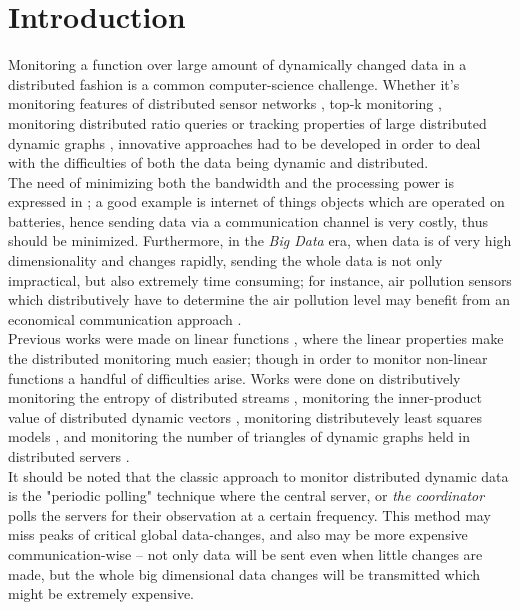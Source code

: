 \documentclass[10pt, conference]{IEEEtran}
\begin{document}
\section{Introduction}
Monitoring a function over large amount of dynamically changed data in a distributed fashion is a common computer-science challenge. Whether it's monitoring features of distributed sensor networks \cite{burdakis2012detecting}, top-k monitoring \cite{babcock2003distributed}, monitoring distributed ratio queries \cite{gupta2013ratio} or tracking properties of large distributed dynamic graphs \cite{mcgregor2015densest}, innovative approaches had to be developed in order to deal with the difficulties of both the data being dynamic and distributed. \\
The need of minimizing both the bandwidth and the processing power is expressed in \cite{giatrakos2013network}; a good example is internet of things objects which are operated on batteries, hence sending data via a communication channel is very costly, thus should be minimized. Furthermore, in the \textit{Big Data} era, when data is of very high dimensionality and changes rapidly, sending the whole data is not only impractical, but also extremely time consuming; for instance, air pollution sensors which distributively have to determine the air pollution level may benefit from an economical communication approach \cite{cheng2004revised}. \\
Previous works were made on linear functions \cite{keralapura2006communication}, where the linear properties make the distributed monitoring much easier; though in order to monitor non-linear functions a handful of difficulties arise. Works were done on distributively monitoring the entropy of distributed streams \cite{gabel2017anarchists}\cite{cormode2013continuous}, monitoring the inner-product value of distributed dynamic vectors \cite{garofalakis2013sketch}, monitoring distributevely least squares models \cite{gabel2015monitoring}, and monitoring the number of triangles of dynamic graphs held in distributed servers \cite{yehuda2017monitoring}. \\
It should be noted that the classic approach to monitor distributed dynamic data is the "periodic polling" technique \cite{cormode2013continuous} where the central server, or \textit{the coordinator} polls the servers for their observation at a certain frequency. This method may miss peaks of critical global data-changes, and also may be more expensive communication-wise -- not only data will be sent even when little changes are made, but the whole big dimensional data changes will be transmitted which might be extremely expensive. \\
\end{document}
